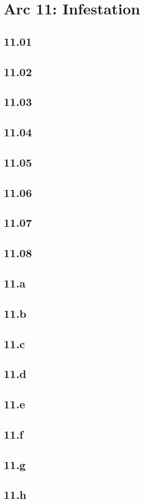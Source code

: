 \part{Arc 11: Infestation}
 \chapter{11.01}
 \chapter{11.02}
 \chapter{11.03}
 \chapter{11.04}
 \chapter{11.05}
 \chapter{11.06}
 \chapter{11.07}
 \chapter{11.08}
 \chapter{11.a}
 \chapter{11.b}
 \chapter{11.c}
 \chapter{11.d}
 \chapter{11.e}
 \chapter{11.f}
 \chapter{11.g}
 \chapter{11.h}

















